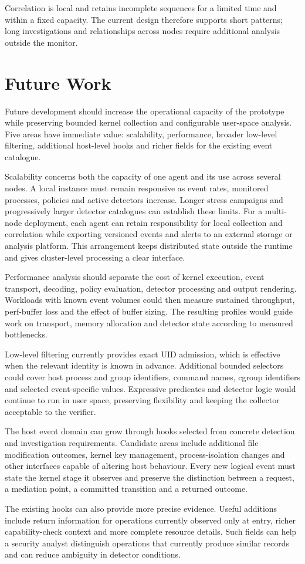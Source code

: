 Correlation is local and retains incomplete sequences for a limited
time and within a fixed capacity. The current design therefore supports
short patterns; long investigations and relationships across nodes
require additional analysis outside the monitor.

\section{Future Work}
\label{sec:conclusions-future-work}

Future development should increase the operational capacity of the prototype
while preserving bounded kernel collection and configurable user-space
analysis. Five areas have immediate value: scalability, performance, broader
low-level filtering, additional host-level hooks and richer fields for the
existing event catalogue.

Scalability concerns both the capacity of one agent and its use across several
nodes. A local instance must remain responsive as event rates, monitored
processes, policies and active detectors increase. Longer stress campaigns and
progressively larger detector catalogues can establish these limits. For a
multi-node deployment, each agent can retain responsibility for local
collection and correlation while exporting versioned events and alerts to an
external storage or analysis platform. This arrangement keeps distributed
state outside the runtime and gives cluster-level processing a
clear interface.

Performance analysis should separate the cost of kernel execution, event
transport, decoding, policy evaluation, detector processing and output
rendering. Workloads with known event volumes could then
measure sustained throughput, perf-buffer loss and the effect of buffer sizing.
The resulting profiles would guide work on transport, memory allocation and
detector state according to measured bottlenecks.

Low-level filtering currently provides exact UID admission, which is effective
when the relevant identity is known in advance. Additional bounded selectors
could cover host process and group identifiers, command names, cgroup
identifiers and selected event-specific values. Expressive predicates and detector logic
would continue to run in user space, preserving flexibility and keeping the
collector acceptable to the verifier.

The host event domain can grow through hooks selected from concrete detection
and investigation requirements. Candidate areas include additional file
modification outcomes, kernel key management, process-isolation changes and
other interfaces capable of altering host behaviour. Every new logical event
must state the kernel stage it observes and preserve the distinction between a
request, a mediation point, a committed transition and a returned outcome.

The existing hooks can also provide more precise evidence. Useful additions
include return information for operations currently observed only at entry,
richer capability-check context and more complete
resource details. Such fields can help a security
analyst distinguish operations that currently produce similar records and can
reduce ambiguity in detector conditions.